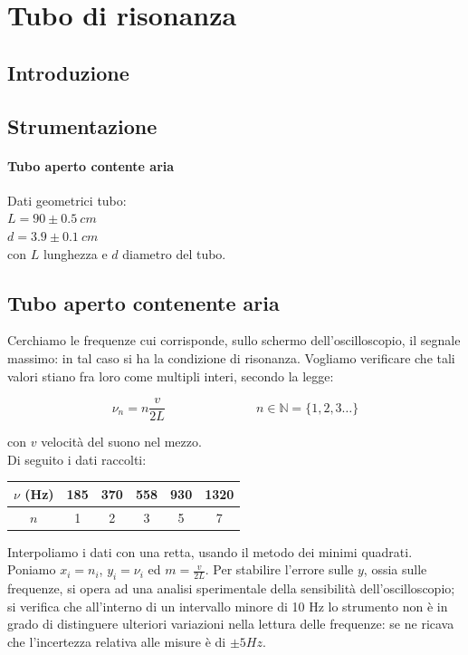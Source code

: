 
\chapter{Tubo di risonanza}

\section{Introduzione}

\section{Strumentazione}
\subsubsection{Tubo aperto contente aria}
Dati geometrici tubo:\\
$L = 90\pm 0.5\ cm$\\
$d = 3.9\pm 0.1\ cm$\\
con $L$ lunghezza e $d$ diametro del tubo.

\section{Tubo aperto contenente aria}
Cerchiamo le frequenze cui corrisponde, sullo schermo dell'oscilloscopio, il segnale massimo: in tal caso si ha la condizione di risonanza. Vogliamo verificare che tali valori stiano fra loro come multipli interi, secondo la legge:

\begin{equation} \label{eq:gianni}
\nu_n= n\frac{v}{2L} \hspace{3cm} n\in\mathbb{N} = \lbrace 1,2,3 \dots \rbrace
\end{equation}

con $v$ velocità del suono nel mezzo.
\\
Di seguito i dati raccolti:
\begin{center}
\begin{tabular}{c|c|c|c|c|c}
$\nu$ (Hz) & 185 & 370 & 558 & 930 & 1320 \\
\midrule
$n$ & 1 & 2 & 3 & 5 & 7\\
\end{tabular}
\end{center}

Interpoliamo i dati con una retta, usando il metodo dei minimi quadrati. Poniamo $x_i=n_i$, $y_i=\nu_i$ ed $m=\displaystyle{\frac{v}{2L}}$. Per stabilire l'errore sulle $y$, ossia sulle frequenze, si opera ad una analisi sperimentale della sensibilità dell'oscilloscopio; si verifica che all'interno di un intervallo minore di 10 Hz lo strumento non è in grado di distinguere ulteriori variazioni nella lettura delle frequenze: se ne ricava che l'incertezza relativa alle misure è di $\pm5 Hz$.

